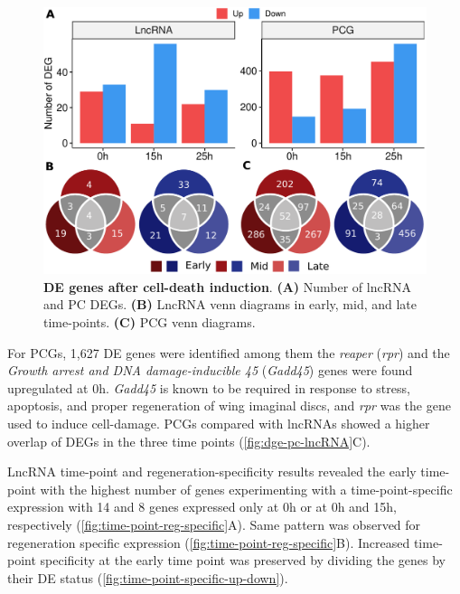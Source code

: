 \begin{figure}[!htb]
  \centering
  \includegraphics[scale=0.33]{plots/results/dme/PC.lncRNA.results.pdf}
  \caption[DE genes after cell-death induction]{\textbf{DE genes after cell-death induction}. \textbf{(A)} Number of lncRNA and PC DEGs. \textbf{(B)} LncRNA venn diagrams in early, mid, and late time-points. \textbf{(C)} PCG venn diagrams.}
  \label{fig:dge-pc-lncRNA}
\end{figure}

For PCGs, 1,627 DE genes were identified among them the \textit{reaper} (\textit{rpr}) and the \textit{Growth arrest and DNA damage-inducible 45} (\textit{Gadd45}) genes were found upregulated at 0h. \textit{Gadd45} is known to be required in response to stress, apoptosis, and proper regeneration of wing imaginal discs,\autocite{camilleri_2019,blanco_2010} and \textit{rpr} was the gene used to induce cell-damage.\autocite{vizcaya_2018} PCGs compared with lncRNAs showed a higher overlap of DEGs in the three time points (\autoref{fig:dge-pc-lncRNA}C).

LncRNA time-point and regeneration-specificity results revealed the early time-point with the highest number of genes experimenting with a time-point-specific expression with 14 and 8 genes expressed only at 0h or at 0h and 15h, respectively (\autoref{fig:time-point-reg-specific}A).  Same pattern was observed for regeneration specific expression (\autoref{fig:time-point-reg-specific}B). Increased time-point specificity at the early time point was preserved by dividing the genes by their DE status (\autoref{fig:time-point-specific-up-down}). 

